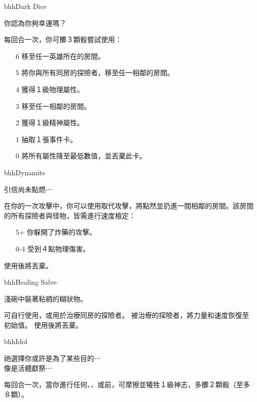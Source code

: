 \begin{ItemCard}{bhh}{Dark Dice}{}
  \begin{CardStory}
    你認為你夠幸運嗎？
  \end{CardStory}
  每回合一次，你可擲３顆骰嘗試使用\ThisName{}：
  \begin{itemize}
    \item[6] 移至任一英雄所在的房間。
    \item[5] 將你與所有同房的探險者，移至任一相鄰的房間。
    \item[4] 獲得１級物理屬性。
    \item[3] 移至任一相鄰的房間。
    \item[2] 獲得１級精神屬性。
    \item[1] 抽取１張事件卡。
    \item[0] 將所有屬性降至最低數值，並丟棄此卡。
  \end{itemize}
\end{ItemCard}%
\linebreak[0]%
\begin{ItemCard}{bhh}{Dynamite}{}
  \begin{CardStory}
    引信尚未點燃⋯
  \end{CardStory}
  在你的一次攻擊中，你可以使用\ThisName{}取代攻擊，將\ThisName{}點然並扔進一間相鄰的房間。該房間的所有探險者與怪物，皆需進行速度檢定：
  \begin{itemize}
    \item[5+] 你躲開了炸藥的攻擊。
    \item[0-4] 受到４點物理傷害。
  \end{itemize}
  使用後將\ThisName{}丟棄。\smallbreak
\end{ItemCard}%
\linebreak[0]%
\begin{ItemCard}{bhh}{Healing Salve}{}
  \begin{CardStory}
    淺碗中裝著粘稠的糊狀物。
  \end{CardStory}
  可自行使用，或用於治療同房的探險者。\smallbreak
  被\ThisName{}治療的探險者，將力量和速度恢復至初始值。\smallbreak
  使用後將\ThisName{}丟棄。\smallbreak
\end{ItemCard}%
\linebreak[0]%
\begin{ItemCard}{bhh}{Idol}{}
  \begin{CardStory}
    祂選擇你或許是為了某些目的⋯\\
    像是活體獻祭⋯
  \end{CardStory}
  每回合一次，當你進行任何、、或前，可摩擦\ThisName{}並犧牲１級神志，多擲２顆骰（至多８顆）。\smallbreak
\end{ItemCard}%
